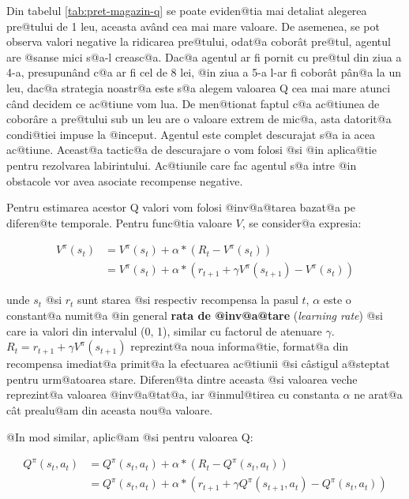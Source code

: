 Din tabelul \ref{tab:pret-magazin-q} se poate eviden@tia mai detaliat alegerea pre@tului de 1 leu, aceasta av\^and cea mai mare valoare. De asemenea, se pot observa valori negative la ridicarea pre@tului, odat@a cobor\^ at pre@tul, agentul are @sanse mici s@a-l creasc@a. Dac@a agentul ar fi pornit cu pre@tul din ziua a 4-a, presupun\^ and c@a ar fi cel de 8 lei, @in ziua a 5-a l-ar fi cobor\^ at p\^ an@a la un leu, dac@a strategia noastr@a este s@a alegem valoarea Q cea mai mare atunci c\^and decidem ce ac@tiune vom lua. De men@tionat faptul c@a ac@tiunea de cobor\^ are a pre@tului sub un leu are o valoare extrem de mic@a, asta datorit@a condi@tiei impuse la @inceput. Agentul este complet descurajat s@a ia acea ac@tiune. Aceast@a tactic@a de descurajare o vom folosi @si @in aplica@tie pentru rezolvarea labirintului. Ac@tiunile care fac agentul s@a intre @in obstacole vor avea asociate recompense negative.

Pentru estimarea acestor Q valori vom folosi @inv@a@tarea bazat@a pe diferen@te temporale. Pentru func@tia valoare $V$, se consider@a expresia:



\begin{align}
	V^{\pi}(s_t) & =  V^{\pi}(s_t) + \alpha * \left( R_t - V^{\pi}(s_t) \right) \nonumber \\
	 & =  V^{\pi}(s_t) + \alpha * \left( r_{t+1} + \gamma V^{\pi}(s_{t+1})  - V^{\pi}(s_t) \right)
\end{align}

\noindent unde $s_t$ @si $r_t$ sunt starea @si respectiv recompensa la pasul $t$, $\alpha$ este o constant@a numit@a @in general \textbf{rata de @inv@a@tare} (\textsl{learning rate}) @si care ia valori din intervalul (0, 1), similar cu factorul de atenuare $\gamma$. $R_t = r_{t+1} + \gamma V^{\pi}(s_{t+1}) $ reprezint@a noua informa@tie, format@a din recompensa imediat@a primit@a la efectuarea ac@tiunii @si c\^ astigul a@steptat pentru urm@atoarea stare. Diferen@ta dintre aceasta @si valoarea veche reprezint@a valoarea @inv@a@tat@a, iar @inmul@tirea cu constanta $\alpha$ ne arat@a c\^ at prealu@am din aceasta nou@a valoare.

@In mod similar, aplic@am @si pentru valoarea Q:

\begin{align}
	Q^{\pi}(s_t, a_t) & =  Q^{\pi}(s_t, a_t) + \alpha * \left( R_t - Q^{\pi}(s_t, a_t) \right) \nonumber \\
	 & =  Q^{\pi}(s_t, a_t) + \alpha * \left( r_{t+1} + \gamma Q^{\pi}(s_{t+1}, a_t)  - Q^{\pi}(s_t, a_t) \right)
\end{align}


